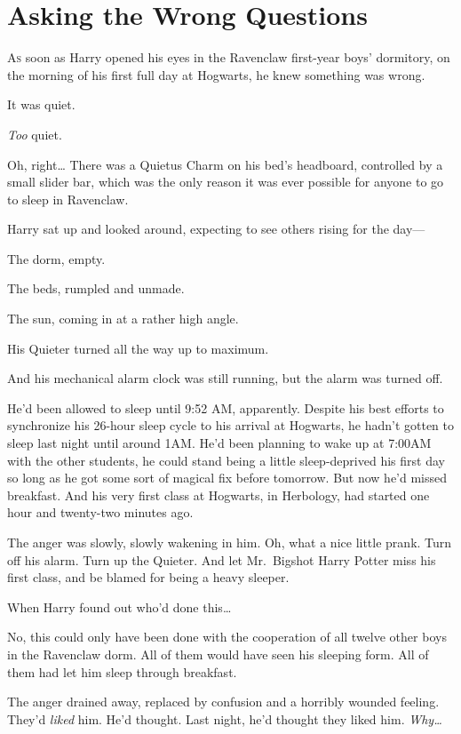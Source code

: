 \chapter{Asking the Wrong Questions}

\lettrine{A}{s} soon as Harry opened his eyes in the Ravenclaw first-year boys' dormitory, 
on the morning of his first full day at Hogwarts, he knew something was wrong.

It was quiet.

\emph{Too} quiet.

Oh, right{\ldots} There was a Quietus Charm on his bed's headboard, controlled 
by a small slider bar, which was the only reason it was ever possible for 
anyone to go to sleep in Ravenclaw.

Harry sat up and looked around, expecting to see others rising for the day---

The dorm, empty.

The beds, rumpled and unmade.

The sun, coming in at a rather high angle.

His Quieter turned all the way up to maximum.

And his mechanical alarm clock was still running, but the alarm was turned off.

He'd been allowed to sleep until 9:52 AM, apparently. Despite his best efforts 
to synchronize his 26-hour sleep cycle to his arrival at Hogwarts, he hadn't 
gotten to sleep last night until around 1AM. He'd been planning to wake up at 
7:00AM with the other students, he could stand being a little sleep-deprived 
his first day so long as he got some sort of magical fix before tomorrow. But 
now he'd missed breakfast. And his very first class at Hogwarts, in Herbology, 
had started one hour and twenty-two minutes ago.

The anger was slowly, slowly wakening in him. Oh, what a nice little prank. 
Turn off his alarm. Turn up the Quieter. And let Mr.~Bigshot Harry Potter miss 
his first class, and be blamed for being a heavy sleeper.

When Harry found out who'd done this{\ldots}

No, this could only have been done with the cooperation of all twelve other 
boys in the Ravenclaw dorm. All of them would have seen his sleeping form. All 
of them had let him sleep through breakfast.

The anger drained away, replaced by confusion and a horribly wounded feeling. 
They'd \emph{liked} him. He'd thought. Last night, he'd thought they liked him. 
\emph{Why{\ldots}}

